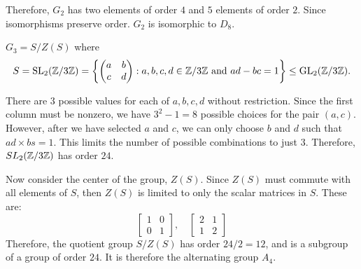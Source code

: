 \begin{enumalph}
\begin{Answer}
      Therefore, $G_2$ has two elements of order $4$ and $5$ elements of order $2$.
      Since isomorphisms preserve order. $G_2$ is isomorphic to $D_8$.
    \end{Answer}
  
  \newpage
  \item $G_3=S/Z(S)$ where
    \[ S=\operatorname{SL}_2(\mathbb{Z}/3\mathbb{Z})=\left\{ \begin{pmatrix} a & b \\ c & d \end{pmatrix} : a,b,c,d
    \in \mathbb{Z}/3\mathbb{Z} \text{ and } ad-bc=1 \right\} \leq \mathrm{GL}_2(\mathbb{Z}/3\mathbb{Z}). \]

    \begin{Answer}
      There are $3$ possible values for each of $a, b, c, d$ without restriction.
      Since the first column must be nonzero,
      we have $3^2 - 1 = 8$ possible choices for the pair $(a, c)$.
      However, after we have selected $a$ and $c$, we can only choose $b$ and $d$
      such that $ad \times bs = 1$. This limits the number of possible combinations to just $3$.
      Therefore, $SL_2(\mathbb{Z}/3\mathbb{Z})$ has order $24$.

      Now consider the center of the group, $Z(S)$. Since $Z(S)$
      must commute with all elements of $S$, then $Z(S)$ is limited
      to only the scalar matrices in $S$.
      These are:
      \[
        \begin{bmatrix}
          1 & 0 \\
          0 & 1
        \end{bmatrix}, \quad
        \begin{bmatrix}
          2 & 1 \\
          1 & 2
        \end{bmatrix}
      \]
      Therefore, the quotient group $S/Z(S)$ has order $24/2 = 12$,
      and is a subgroup of a group of order $24$.
      It is therefore the alternating group $A_4$.      
    \end{Answer}


\end{enumalph}

